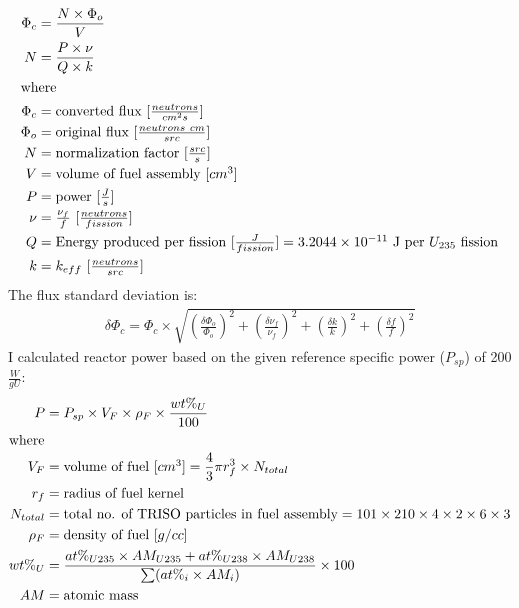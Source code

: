 \begin{align}
    \Phi_c &= \frac{N \times \Phi_o}{V} \\
    N &= \frac{P\times\nu}{Q\times k} \\
    \intertext{where}
    \Phi_c &= \mbox{converted flux [$\frac{neutrons}{cm^2s}$]} \nonumber \\ 
    \Phi_o &= \mbox{original flux [$\frac{neutrons\ cm}{src}$]} \nonumber \\
    N &= \mbox{normalization factor [$\frac{src}{s}$]} \nonumber \\
    V &= \mbox{volume of fuel assembly [$cm^3$]} \nonumber \\
    P &= \mbox{power [$\frac{J}{s}$]} \nonumber \\
    \nu &= \mbox{$\frac{\nu_f}{f}$ [$\frac{neutrons}{fission}$]} \nonumber \\
    Q &= \mbox{Energy produced per fission [$\frac{J}{fission}$]} = \mbox{$3.2044 \times 10^{-11}$ J per $U_{235}$ fission} \nonumber \\
    k &= \mbox{$k_{eff}$ [$\frac{neutrons}{src}$]} \nonumber 
\end{align}
The flux standard deviation is: 
\begin{align}
    \delta \Phi_c = \Phi_c \times
    \sqrt{(\frac{\delta \Phi_o}{\Phi_o})^2+ (\frac{\delta \nu_f}{\nu_f})^2 
    + (\frac{\delta k}{k})^2 + (\frac{\delta f}{f})^2}
\end{align}
I calculated reactor power based on the given reference specific power 
($P_{sp}$) of 200 $\frac{W}{gU}$: 
\begin{align}
    P &= P_{sp} \times V_F \times \rho_F \times \frac{wt\%_{U}}{100} \\
    \intertext{where}
    V_F &= \mbox{volume of fuel [$cm^3$]} = \frac{4}{3} \pi r_f^3 \times N_{total} \nonumber \\
    r_f &= \mbox{radius of fuel kernel} \nonumber\\
    N_{total} &= \mbox{total no. of TRISO particles in fuel assembly} = 101 \times 210 \times 4 \times 2 \times 6 \times 3 \nonumber\\ 
    \rho_F &= \mbox{density of fuel [$g/cc$]} \nonumber \\
    wt\%_{U} &= \frac{at\%_{U235} \times AM_{U235} + at\%_{U238} \times AM_{U238}}{\sum (at\%_i \times AM_i)} \times 100 \nonumber\\
    AM &= \mbox{atomic mass} \nonumber
\end{align}

